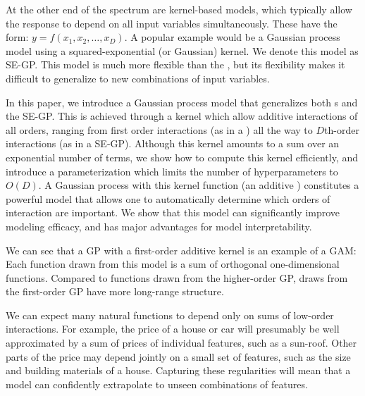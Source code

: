 At the other end of the spectrum are kernel-based models, which typically allow the response to depend on all input variables simultaneously.
These have the form: $y = f(x_1, x_2, \dots, x_D)$.
A popular example would be a Gaussian process model using a squared-exponential (or Gaussian) kernel.
We denote this model as SE-GP.
This model is much more flexible than the \GAM{}, but its flexibility makes it difficult to generalize to new combinations of input variables.

In this paper, we introduce a Gaussian process model that generalizes both \GAM{}s and the SE-GP.
This is achieved through a kernel which allow additive interactions of all orders, ranging from first order interactions (as in a \GAM{}) all the way to $D$th-order interactions (as in a SE-GP).
Although this kernel amounts to a sum over an exponential number of terms, we show how to compute this kernel efficiently, and introduce a parameterization which limits the number of hyperparameters to $O(D)$.
A Gaussian process with this kernel function (an additive \gp{}) constitutes a powerful model that allows one to automatically determine which orders of interaction are important.
We show that this model can significantly improve modeling efficacy, and has major advantages for model interpretability.



We can see that a GP with a first-order additive kernel is an example of a GAM:  Each function drawn from this model is a sum of orthogonal one-dimensional functions.  Compared to functions drawn from the higher-order GP, draws from the first-order GP have more long-range structure.



We can expect many natural functions to depend only on sums of low-order interactions.  For example, the price of a house or car will presumably be well approximated by a sum of prices of individual features, such as a sun-roof.  
Other parts of the price may depend jointly on a small set of features, such as the size and building materials of a house.
Capturing these regularities will mean that a model can confidently extrapolate to unseen combinations of features.


